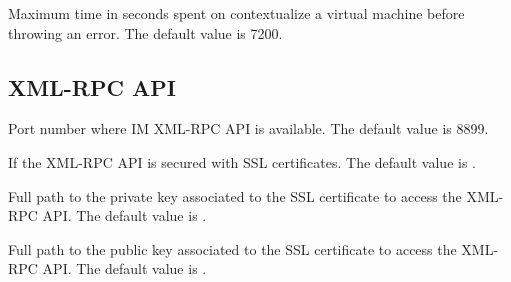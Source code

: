 \documentclass[letterpaper,10pt,english]{sphinxmanual}
\begin{document}

\begin{fulllineitems}
\label{manual:confval-MAX_CONTEXTUALIZATION_TIME}
Maximum time in seconds spent on contextualize a virtual machine before
throwing an error.
The default value is 7200.

\end{fulllineitems}



\subsection{XML-RPC API}
\label{manual:options-xmlrpc}\label{manual:xml-rpc-api}

\begin{fulllineitems}
\label{manual:confval-XMLRCP_PORT}
Port number where IM XML-RPC API is available.
The default value is 8899.

\end{fulllineitems}


\begin{fulllineitems}
\label{manual:confval-XMLRCP_SSL}
If  the XML-RPC API is secured with SSL certificates.
The default value is .

\end{fulllineitems}


\begin{fulllineitems}
\label{manual:confval-XMLRCP_SSL_KEYFILE}
Full path to the private key associated to the SSL certificate to access
the XML-RPC API.
The default value is .

\end{fulllineitems}


\begin{fulllineitems}
\label{manual:confval-XMLRCP_SSL_CERTFILE}
Full path to the public key associated to the SSL certificate to access
the XML-RPC API.
The default value is .

\end{fulllineitems}
\end{document}
